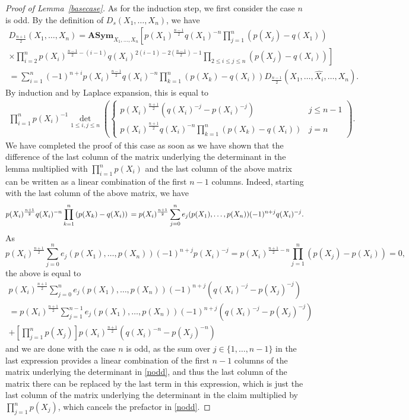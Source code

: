 \documentclass[12pt,dvipsnames]{amsart}
\theoremstyle{definition}
\newcommand{\asym}{\mathbf{ASym}}
\begin{document}
\begin{proof}[Proof of Lemma~\ref{basecase}]
As for the induction step, we first consider the case $n$ is odd. 
By the definition of $D_s(X_1,\ldots,X_n)$, we have 
\begin{multline*} 
D_{ \frac{n+1}{2} }(X_1,\ldots,X_n) = 
\asym_{X_1,\ldots,X_n} \left[ 
p(X_1)^{ \frac{n-1}{2}}  q(X_1)^{-n} \prod_{j=1}^n \left( p(X_j)-q(X_1) \right) \right. \\
\left. \times 
\prod_{i=2}^{n} p(X_i)^{ \frac{n-1}{2} -(i-1)} q(X_i)^{2(i-1)-2  \left( \frac{n-1}{2}\right) -1}
\prod_{2 \le i \le j \le n} (p(X_j)-q(X_i)) \right] \\
= \sum_{i=1}^{n} (-1)^{n+i} p(X_i)^{ \frac{n-1}{2} } q(X_i)^{-n} \prod_{k=1}^n \left( p(X_k)-q(X_i) \right)
D_{\frac{n-1}{2}}(X_1,\ldots,\widehat{X_i},\ldots,X_n).
\end{multline*} 
By induction and by Laplace expansion, this is equal to 
\begin{multline} 
\label{nodd} 
\prod_{i=1}^n p(X_i)^{-1} \det_{1 \le i, j \le n}
\left( \begin{cases} p(X_i)^{ \frac{n+1}{2}} \left( q(X_i)^{-j} - p(X_i)^{-j} \right) & j \le n-1 \\
        p(X_i)^{ \frac{n+1}{2} } q(X_i)^{-n} \prod_{k=1}^n \left( p(X_k)-q(X_i) \right) & j=n \end{cases} \right).
\end{multline} 
We have completed the proof of this case as soon as we have shown that the difference of the last column of the matrix underlying the determinant in the 
lemma multiplied with $\prod_{i=1}^n p(X_i)$ and the last column of the above matrix can be written as a linear combination of the first $n-1$ columns.
Indeed, starting with the last column of the above matrix, we have 
$$
p(X_i)^{ \frac{n+1}{2} } q(X_i)^{-n} \prod_{k=1}^n \left( p(X_k)-q(X_i) \right) \\ 
=  p(X_i)^{ \frac{n+1}{2}} \sum_{j=0}^n e_j(p(X_1),\ldots,p(X_n)) (-1)^{n+j} q(X_i)^{-j}.
$$
As 
$$
p(X_i)^{ \frac{n+1}{2} }  \sum_{j=0}^n e_j(p(X_1),\ldots,p(X_n)) (-1)^{n+j} p(X_i)^{-j} = 
p(X_i)^{ \frac{n+1}{2}-n} \prod_{j=1}^n \left( p(X_j)-p(X_i) \right)=0,
$$
the above is equal to 
\begin{multline*} 
p(X_i)^{ \frac{n+1}{2} }  \sum_{j=0}^n e_j(p(X_1),\ldots,p(X_n)) (-1)^{n+j} \left( q(X_i)^{-j}- p(X_j)^{-j} \right) \\ =
p(X_i)^{ \frac{n+1}{2} }  \sum_{j=1}^{n-1} e_j(p(X_1),\ldots,p(X_n)) (-1)^{n+j} \left( q(X_i)^{-j}- p(X_j)^{-j} \right) \\
+ \left[ \prod_{j=1}^n p(X_j) \right] p(X_i)^{ \frac{n+1}{2}} \left( q(X_i)^{-n}- p(X_j)^{-n} \right)
\end{multline*}
and we are done with the case $n$ is odd, as the sum over $j \in \{1,\ldots,n-1\}$ in the last expression provides a linear combination of the first 
$n-1$ columns of the matrix underlying the determinant in \eqref{nodd}, and thus the last column of the matrix there can be replaced by the last term 
in this expression, which is just the last column of the matrix underlying the determinant in the claim multiplied by $\prod_{j=1}^n p(X_j)$, 
which cancels the prefactor in \eqref{nodd}. 


\end{proof}
\end{document}
